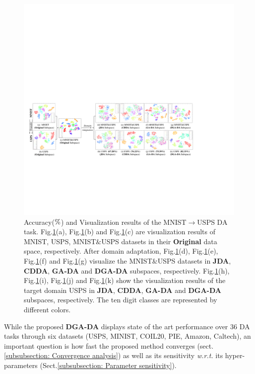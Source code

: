 \documentclass[journal,twocolumn]{IEEEtran}
\begin{document}
\begin{CJK*}{UTF8}{gkai}
\begin{figure}[h!]
	\centering
	\includegraphics[width=0.95\linewidth]{VI.pdf}
	\caption {Accuracy(${\rm{\% }}$) and Visualization results of the MNIST$\rightarrow$USPS DA task. Fig.\ref{fig:vi}(a), Fig.\ref{fig:vi}(b) and Fig.\ref{fig:vi}(c) are visualization results of MNIST, USPS,  MNIST$\& $USPS datasets in their \textbf{Original} data space, respectively. After domain adaptation, Fig.\ref{fig:vi}(d), Fig.\ref{fig:vi}(e), Fig.\ref{fig:vi}(f) and Fig.\ref{fig:vi}(g) visualize the MNIST$\& $USPS datasets in \textbf{JDA}, \textbf{CDDA}, \textbf{GA-DA} and \textbf{DGA-DA} subspaces, respectively. Fig.\ref{fig:vi}(h), Fig.\ref{fig:vi}(i), Fig.\ref{fig:vi}(j) and Fig.\ref{fig:vi}(k) show the visualization results of the target domain USPS in \textbf{JDA}, \textbf{CDDA}, \textbf{GA-DA} and \textbf{DGA-DA} subspaces, respectively. The ten digit classes are represented by different colors.}  
    	\label{fig:vi}
\end{figure} 



While the proposed \textbf{DGA-DA} displays state of the art performance over 36 DA tasks through six datasets (USPS, MINIST, COIL20, PIE, Amazon, Caltech), an important question is how fast the proposed method converges (sect.\ref{subsubsection: Convergence analysis}) as well as its sensitivity \textit{w.r.t.} its hyper-parameters (Sect.\ref{subsubsection: Parameter sensitivity}). 


\end{CJK*}
\end{document}
